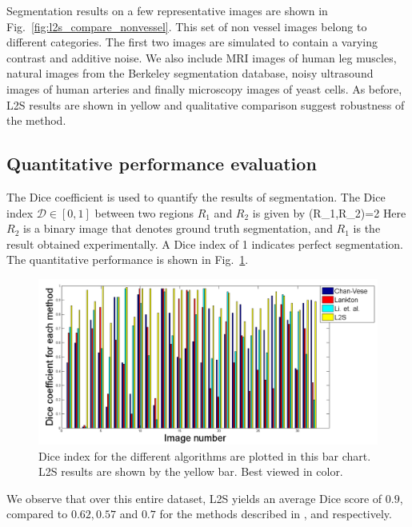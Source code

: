 Segmentation results on a few representative images are  shown in Fig.~\ref{fig:l2s_compare_nonvessel}. This set of non vessel images belong to different categories. The first two images are simulated to contain a varying contrast and additive noise. We also include MRI images of human leg muscles, natural images from the Berkeley segmentation database\cite{BerkeleySegDatabase}, noisy ultrasound images of human arteries and finally microscopy images of yeast cells. As before, L2S results are shown in yellow and qualitative comparison suggest robustness of the method.

\subsection{Quantitative performance evaluation}
The Dice coefficient \cite{bernard_splinedCV} is used to quantify the results of segmentation. The Dice index $\mathcal{D}\in [0,1]$ between two regions $R_1$ and $R_2$ is given by 
\bea
{}(R_1,R_2)=2
\label{eq:Dice}
\eea
Here $R_2$ is a binary image that denotes ground truth segmentation, and $R_1$ is the result obtained experimentally. A Dice index of 1 indicates perfect segmentation. The quantitative performance is shown in Fig.~\ref{fig:L2S_Dice}. 
\begin{figure}[t]
\centering
\includegraphics[width=1\textwidth]{images/L2S_Dice}
\caption[Quantitative comparison of L2S]{Dice index for the different algorithms are plotted in this bar chart. L2S results are shown by the yellow bar. Best viewed in color.}	
\label{fig:L2S_Dice}
\end{figure}
We observe that over this entire dataset, L2S yields an average Dice score of $0.9$, compared to $0.62,0.57$ and $0.7$ for the methods described in \cite{chan_vese},\cite{lankton_localCV} and \cite{li_region_scalable} respectively. 

